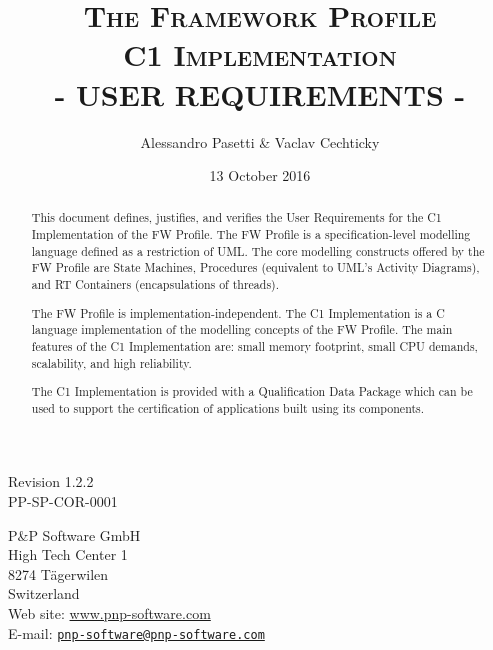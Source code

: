 \documentclass[a4paper,10pt]{article}
\title{\textsc{The Framework Profile} \\ \textsc{C1 Implementation} \\ \textsc{- USER REQUIREMENTS -}}
\date{13 October 2016}
\author{Alessandro Pasetti \& Vaclav Cechticky}
\begin{document}
\maketitle

\begin{center}
Revision 1.2.2 \\
PP-SP-COR-0001
\end{center}

\begin{center}
P\&P Software GmbH \\
High Tech Center 1 \\
8274 T\"{a}gerwilen \\
Switzerland \\
\vspace{2mm}
Web site: \url{www.pnp-software.com}\\
E-mail: \href{mailto:pnp-software@pnp-software.com}{\nolinkurl{pnp-software@pnp-software.com}} 
\end{center}


\begin{table}[ht]
\begin{center}
\begin{tabular}{p{11.7cm}}
\\
\hline
\end{tabular}
\end{center}
\end{table}
\begin{abstract}
This document defines, justifies, and verifies the User Requirements for the C1 Implementation of the FW Profile. The FW Profile is a specification-level modelling 
language defined as a restriction of UML. The core modelling constructs offered by the FW Profile are State Machines, Procedures (equivalent to UML's Activity Diagrams), and RT Containers (encapsulations of threads).
\par
The FW Profile is implementation-independent. The C1 Implementation is a C language implementation of the modelling concepts of the FW Profile. The main features of the C1 Implementation are: small memory footprint, small CPU demands, scalability, and
high reliability.
\par 
The C1 Implementation is provided with a Qualification Data Package which can be used to support the certification of applications built using its components.
\end{abstract}
\begin{table}[ht]
\begin{center}
\begin{tabular}{p{11.7cm}}
\\
\hline
\end{tabular}
\end{center}
\end{table}
\end{document}
